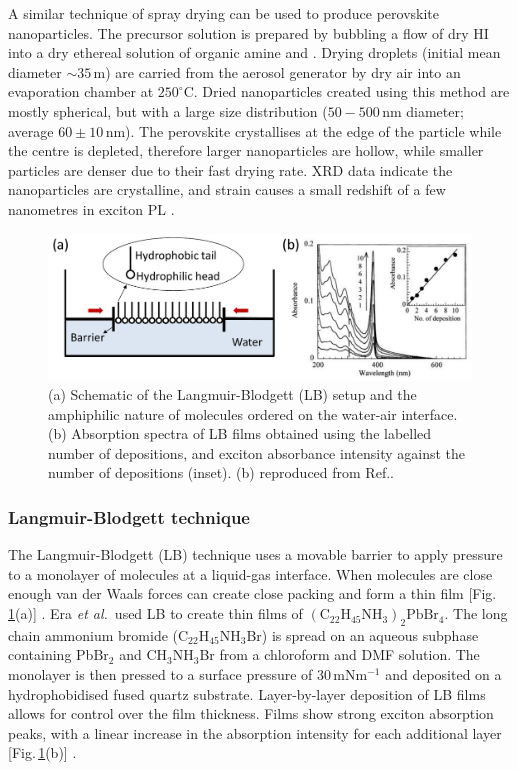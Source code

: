 A similar technique of spray drying can be used to produce perovskite nanoparticles. The precursor solution is prepared by bubbling a flow of dry HI into a dry ethereal solution of organic amine %
and . %
Drying droplets (initial mean diameter $\sim 35\,$\textmu m) are carried from the aerosol generator by dry air into an evaporation chamber at $250^{\circ}$C. Dried nanoparticles created using this method are mostly spherical, but with a large size distribution ($50-500$\,nm diameter; average $60\pm10$\,nm). The perovskite crystallises at the edge of the particle while the centre is depleted, therefore larger nanoparticles are hollow, while smaller particles are denser due to their fast drying rate. XRD data indicate the nanoparticles are crystalline, and strain causes a small redshift of a few nanometres in exciton PL \cite{Audebert2009a}.

\begin{figure} [h!]
\centering
\includegraphics[width=\textwidth]{Fig6}
\caption{(a) Schematic of the Langmuir-Blodgett (LB) setup and the amphiphilic nature of molecules ordered on the water-air interface. (b) Absorption spectra of LB films obtained using the labelled number of depositions, and exciton absorbance intensity against the number of depositions (inset). (b) reproduced from Ref.\!.}
\label{2Fig6}
\end{figure}
\subsubsection {Langmuir-Blodgett technique}
The Langmuir-Blodgett (LB) technique uses a movable barrier to apply pressure to a monolayer of molecules at a liquid-gas interface. When molecules are close enough van der Waals forces can create close packing and form a thin film [Fig.\,\ref{2Fig6}(a)] \cite{Mitzi2001b}. Era \textit{et al.}\ used LB to create thin films of $(\textrm{C}_{22}\textrm{H}_{45}\textrm{NH}_3)_2\textrm{PbBr}_4$. The long chain ammonium bromide ($\textrm{C}_{22}\textrm{H}_{45}\textrm{NH}_3$Br) is spread on an aqueous subphase containing Pb$\textrm{Br}_2$ and $\textrm{CH}_3\textrm{NH}_3$Br from a chloroform and DMF solution. The monolayer is then pressed to a surface pressure of 30\,mN$\textrm{m}^{-1}$ and deposited on a hydrophobidised fused quartz substrate. Layer-by-layer deposition of LB films allows for control over the film thickness. Films show strong exciton absorption peaks, with a linear increase in the absorption intensity for each additional layer [Fig.\,\ref{2Fig6}(b)] \cite{Era2000}.

